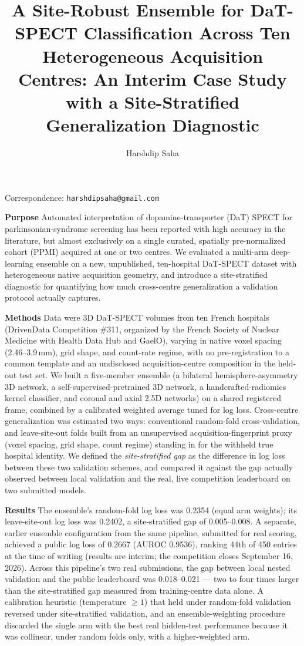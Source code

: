 \documentclass[11pt]{article}
\title{\textbf{A Site-Robust Ensemble for DaT-SPECT Classification Across Ten Heterogeneous Acquisition Centres: An Interim Case Study with a Site-Stratified Generalization Diagnostic}}
\author[1]{Harshdip Saha}
\affil[1]{Independent Researcher}
\date{}
\begin{document}
\maketitle

\begin{center}
\small
Correspondence: \texttt{harshdipsaha@gmail.com}
\end{center}

\bigskip
\noindent\textbf{Purpose} Automated interpretation of dopamine-transporter (DaT) SPECT for parkinsonian-syndrome screening has been reported with high accuracy in the literature, but almost exclusively on a single curated, spatially pre-normalized cohort (PPMI) acquired at one or two centres. We evaluated a multi-arm deep-learning ensemble on a new, unpublished, ten-hospital DaT-SPECT dataset with heterogeneous native acquisition geometry, and introduce a site-stratified diagnostic for quantifying how much cross-centre generalization a validation protocol actually captures.

\smallskip
\noindent\textbf{Methods} Data were 3D DaT-SPECT volumes from ten French hospitals (DrivenData Competition \#311, organized by the French Society of Nuclear Medicine with Health Data Hub and GaelO), varying in native voxel spacing (2.46--3.9\,mm), grid shape, and count-rate regime, with no pre-registration to a common template and an undisclosed acquisition-centre composition in the held-out test set. We built a five-member ensemble (a bilateral hemisphere-asymmetry 3D network, a self-supervised-pretrained 3D network, a handcrafted-radiomics kernel classifier, and coronal and axial 2.5D networks) on a shared registered frame, combined by a calibrated weighted average tuned for log loss. Cross-centre generalization was estimated two ways: conventional random-fold cross-validation, and leave-site-out folds built from an unsupervised acquisition-fingerprint proxy (voxel spacing, grid shape, count regime) standing in for the withheld true hospital identity. We defined the \emph{site-stratified gap} as the difference in log loss between these two validation schemes, and compared it against the gap actually observed between local validation and the real, live competition leaderboard on two submitted models.

\smallskip
\noindent\textbf{Results} The ensemble's random-fold log loss was 0.2354 (equal arm weights); its leave-site-out log loss was 0.2402, a site-stratified gap of 0.005--0.008. A separate, earlier ensemble configuration from the same pipeline, submitted for real scoring, achieved a public log loss of 0.2667 (AUROC 0.9536), ranking 44th of 450 entries at the time of writing (results are interim; the competition closes September 16, 2026). Across this pipeline's two real submissions, the gap between local nested validation and the public leaderboard was 0.018--0.021 --- two to four times larger than the site-stratified gap measured from training-centre data alone. A calibration heuristic (temperature $\geq 1$) that held under random-fold validation reversed under site-stratified validation, and an ensemble-weighting procedure discarded the single arm with the best real hidden-test performance because it was collinear, under random folds only, with a higher-weighted arm.
\end{document}
